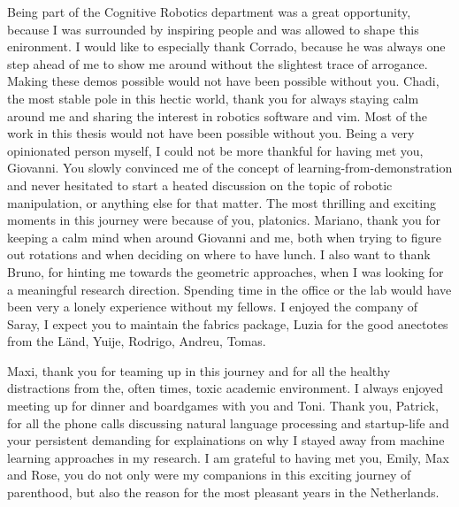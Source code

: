 Being part of the Cognitive Robotics department was a great opportunity,
because I was surrounded by inspiring people and was allowed to shape this
enironment. I would like to especially thank Corrado, because he was always one
step ahead of me to show me around without the slightest trace of arrogance.
Making these demos possible would not have been possible without you. Chadi,
the most stable pole in this hectic world, thank you for always staying calm
around me and sharing the interest in robotics software and vim. Most of the
work in this thesis would not have been possible without you. Being a very
opinionated person myself, I could not be more thankful for having met you,
Giovanni. You slowly convinced me of the concept of learning-from-demonstration
and never hesitated to start a heated discussion on the topic of robotic
manipulation, or anything else for that matter. The most thrilling and exciting
moments in this journey were because of you, platonics. Mariano, thank you for
keeping a calm mind when around Giovanni and me, both when trying to figure out
rotations and when deciding on where to have lunch. I also want to thank Bruno,
for hinting me towards the geometric approaches, when I was looking for a
meaningful research direction. Spending time in the office or the lab would
have been very a lonely experience without my fellows. I enjoyed the company of
Saray, I expect you to maintain the fabrics package, Luzia for the good
anectotes from the Länd, Yuije, Rodrigo, Andreu, Tomas.

Maxi, thank you for teaming up in this journey and for all the healthy
distractions from the, often times, toxic academic environment. I always
enjoyed meeting up for dinner and boardgames with you and Toni. Thank you,
Patrick, for all the phone calls discussing natural language processing and
startup-life and your persistent demanding for explainations on why I stayed
away from machine learning approaches in my research. I am grateful to having
met you, Emily, Max and Rose, you do not only were my companions in this
exciting journey of parenthood, but also the reason for the most pleasant years
in the Netherlands.

